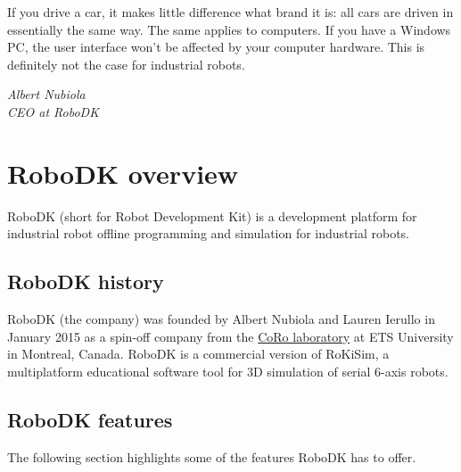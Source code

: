 \epigraph{If you drive a car, it makes little difference what brand it is: all cars are driven
in essentially the same way. The same applies to computers. If you have a
Windows PC, the user interface won’t be affected by your computer hardware.
This is definitely not the case for industrial robots.}{\textit{Albert Nubiola \\ CEO at RoboDK}}

\section{RoboDK overview}

RoboDK (short for Robot Development Kit) is a development platform for industrial robot offline programming and simulation for industrial robots.

\subsection{RoboDK history}

RoboDK (the company) was founded by Albert Nubiola and Lauren Ierullo in January 2015 as a spin-off company from the \href{https://en.etsmtl.ca/unites-de-recherche/coro/accueil?lang=en-CA}{CoRo laboratory}   at ETS University in Montreal, Canada. RoboDK is a commercial version of RoKiSim, a multiplatform educational software tool for 3D simulation of serial 6-axis robots.

\subsection{RoboDK features}


The following section highlights some of the features RoboDK has to offer. 


